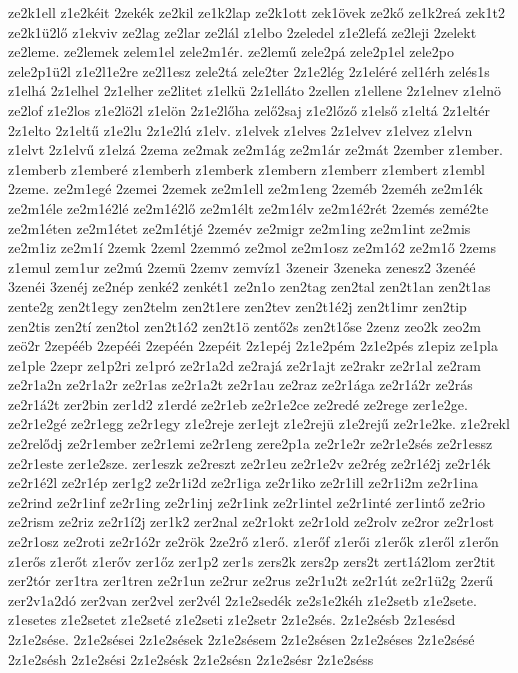 {ze2k1ell
z1e2kéit
2zekék
ze2kil
ze1k2lap
ze2k1ott
zek1övek
ze2kő
ze1k2reá
zek1t2
ze2k1ü2lő
z1ekviv
ze2lag
ze2lar
ze2lál
z1elbo
2zeledel
z1e2lefá
ze2leji
2zelekt
ze2leme.
ze2lemek
zelem1el
zele2m1ér.
ze2lemű
zele2pá
zele2p1el
zele2po
zele2p1ü2l
z1e2l1e2re
ze2l1esz
zele2tá
zele2ter
2z1e2lég
2z1eléré
zel1érh
zelés1s
z1elhá
2z1elhel
2z1elher
ze2litet
z1elkü
2z1elláto
2zellen
z1ellene
2z1elnev
z1elnö
ze2lof
z1e2los
z1e2lö2l
z1elön
2z1e2lőha
zelő2saj
z1e2lőző
z1első
z1eltá
2z1eltér
2z1elto
2z1eltű
z1e2lu
2z1e2lú
z1elv.
z1elvek
z1elves
2z1elvev
z1elvez
z1elvn
z1elvt
2z1elvű
z1elzá
2zema
ze2mak
ze2m1ág
ze2m1ár
ze2mát
2zember
z1ember.
z1emberb
z1emberé
z1emberh
z1emberk
z1embern
z1emberr
z1embert
z1embl
2zeme.
ze2m1egé
2zemei
2zemek
ze2m1ell
ze2m1eng
2zeméb
2zeméh
ze2m1ék
ze2m1éle
ze2m1é2lé
ze2m1é2lő
ze2m1élt
ze2m1élv
ze2m1é2rét
2zemés
zemé2te
ze2m1éten
ze2m1étet
ze2m1étjé
2zemév
ze2migr
ze2m1ing
ze2m1int
ze2mis
ze2m1iz
ze2m1í
2zemk
2zeml
2zemmó
ze2mol
ze2m1osz
ze2m1ó2
ze2m1ő
2zems
z1emul
zem1ur
ze2mú
2zemü
2zemv
zemvíz1
3zeneir
3zeneka
zenesz2
3zenéé
3zenéi
3zenéj
ze2nép
zenké2
zenkét1
ze2n1o
zen2tag
zen2tal
zen2t1an
zen2t1as
zente2g
zen2t1egy
zen2telm
zen2t1ere
zen2tev
zen2t1é2j
zen2t1imr
zen2tip
zen2tis
zen2tí
zen2tol
zen2t1ó2
zen2t1ö
zentő2s
zen2t1őse
2zenz
zeo2k
zeo2m
zeö2r
2zepééb
2zepééi
2zepéén
2zepéit
2z1epéj
2z1e2pém
2z1e2pés
z1epiz
ze1pla
ze1ple
2zepr
ze1p2ri
ze1pró
ze2r1a2d
ze2rajá
ze2r1ajt
ze2rakr
ze2r1al
ze2ram
ze2r1a2n
ze2r1a2r
ze2r1as
ze2r1a2t
ze2r1au
ze2raz
ze2r1ága
ze2r1á2r
ze2rás
ze2r1á2t
zer2bin
zer1d2
z1erdé
ze2r1eb
ze2r1e2ce
ze2redé
ze2rege
zer1e2ge.
ze2r1e2gé
ze2r1egg
ze2r1egy
z1e2reje
zer1ejt
z1e2rejü
z1e2rejű
ze2r1e2ke.
z1e2rekl
ze2relődj
ze2r1ember
ze2r1emi
ze2r1eng
zere2p1a
ze2r1e2r
ze2r1e2sés
ze2r1essz
ze2r1este
zer1e2sze.
zer1eszk
ze2reszt
ze2r1eu
ze2r1e2v
ze2rég
ze2r1é2j
ze2r1ék
ze2r1é2l
ze2r1ép
zer1g2
ze2r1i2d
ze2r1iga
ze2r1iko
ze2r1ill
ze2r1i2m
ze2r1ina
ze2rind
ze2r1inf
ze2r1ing
ze2r1inj
ze2r1ink
ze2r1intel
ze2r1inté
zer1intő
ze2rio
ze2rism
ze2riz
ze2r1í2j
zer1k2
zer2nal
ze2r1okt
ze2r1old
ze2rolv
ze2ror
ze2r1ost
ze2r1osz
ze2roti
ze2r1ó2r
ze2rök
2ze2rő
z1erő.
z1erőf
z1erői
z1erők
z1eről
z1erőn
z1erős
z1erőt
z1erőv
zer1őz
zer1p2
zer1s
zers2k
zers2p
zers2t
zert1á2lom
zer2tit
zer2tór
zer1tra
zer1tren
ze2r1un
ze2rur
ze2rus
ze2r1u2t
ze2r1út
ze2r1ü2g
2zerű
zer2v1a2dó
zer2van
zer2vel
zer2vél
2z1e2sedék
ze2s1e2kéh
z1e2setb
z1e2sete.
z1esetes
z1e2setet
z1e2seté
z1e2seti
z1e2setr
2z1e2sés.
2z1e2sésb
2z1esésd
2z1e2sése.
2z1e2sései
2z1e2sések
2z1e2sésem
2z1e2sésen
2z1e2séses
2z1e2sésé
2z1e2sésh
2z1e2sési
2z1e2sésk
2z1e2sésn
2z1e2sésr
2z1e2séss
}
